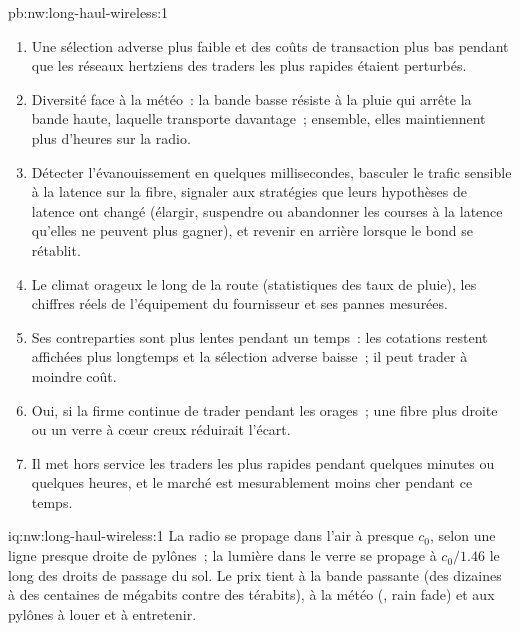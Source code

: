 \begin{solution}{pb:nw:long-haul-wireless:1}
\begin{enumerate}[resume]
  sur toute sa longueur (\qty{80.6}{\milli\metre\per\hour} dans une cellule de dix kilomètres)~; une tempête de \qty{100}{\milli\metre\per\hour} qui traverse la route la place sur la fibre
  pendant 21 minutes, \qty{2.93}{\milli\second} plus lente dans chaque sens.
\item Une sélection adverse plus faible et des coûts de transaction plus bas pendant que les réseaux hertziens des traders les plus rapides étaient perturbés.
\item Diversité face à la météo~: la bande basse résiste à la pluie qui arrête la bande haute, laquelle transporte davantage~; ensemble, elles maintiennent plus d'heures sur
  la radio.
\item Détecter l'évanouissement en quelques millisecondes, basculer le trafic sensible à la latence sur la fibre, signaler aux stratégies que leurs hypothèses de latence ont changé
  (élargir, suspendre ou abandonner les courses à la latence qu'elles ne peuvent plus gagner), et revenir en arrière lorsque le bond se rétablit.
\item Le climat orageux le long de la route (statistiques des taux de pluie), les chiffres réels de l'équipement du fournisseur et ses pannes mesurées.
\item Ses contreparties sont plus lentes pendant un temps~: les cotations restent affichées plus longtemps et la sélection adverse baisse~; il peut trader à moindre coût.
\item Oui, si la firme continue de trader pendant les orages~; une fibre plus droite ou un verre à cœur creux réduirait l'écart.
\item Il met hors service les traders les plus rapides pendant quelques minutes ou quelques heures, et le marché est mesurablement moins cher pendant ce temps.
\end{enumerate}
\end{solution}

\begin{solution}{iq:nw:long-haul-wireless:1}
La radio se propage dans l'air à presque $c_0$, selon une ligne presque droite de pylônes~; la lumière dans le verre se propage à $c_0/1.46$ le long des droits de passage du sol.
Le prix tient à la bande passante (des dizaines à des centaines de mégabits contre des térabits), à la météo (, rain fade) et aux pylônes à louer et à entretenir.
\end{solution}

